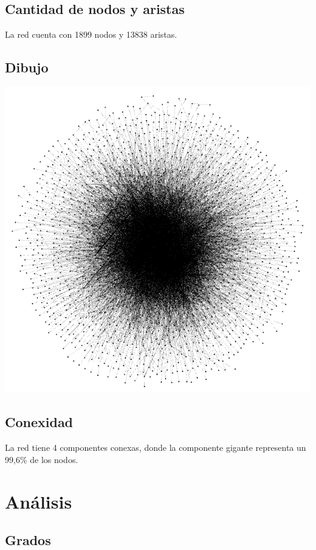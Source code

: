 \documentclass[12pt]{article}
\begin{document}
\subsection{Cantidad de nodos y aristas}
La red cuenta con 1899 nodos y 13838 aristas.

\subsection{Dibujo}
\begin{center}
    \includegraphics[scale=0.4]{images/dibujo_red.png}
\end{center}

\subsection{Conexidad}
La red tiene 4 componentes conexas, donde la componente gigante representa un 99,6\% de los nodos.

\section{Análisis}

\subsection{Grados}
\end{document}
